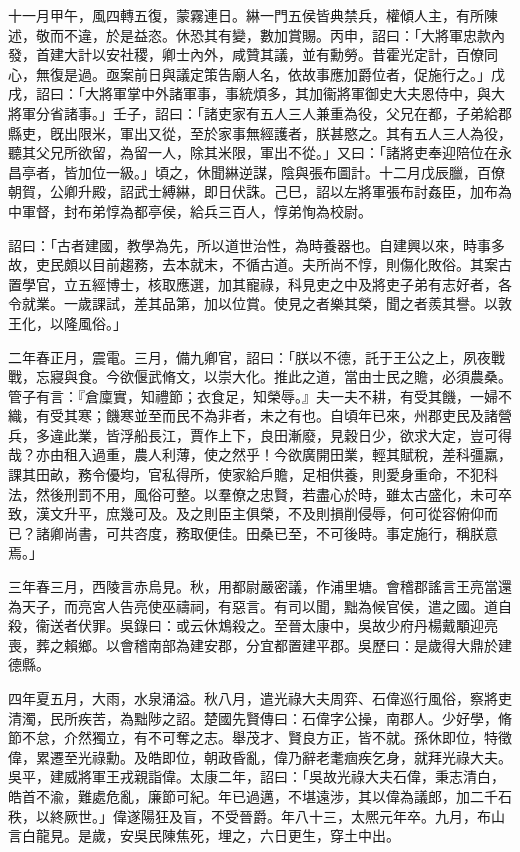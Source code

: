 \begin{pinyinscope}
十一月甲午，風四轉五復，蒙霧連日。綝一門五侯皆典禁兵，權傾人主，有所陳述，敬而不違，於是益恣。休恐其有變，數加賞賜。丙申，詔曰：「大將軍忠款內發，首建大計以安社稷，卿士內外，咸贊其議，並有勳勞。昔霍光定計，百僚同心，無復是過。亟案前日與議定策告廟人名，依故事應加爵位者，促施行之。」戊戌，詔曰：「大將軍掌中外諸軍事，事統煩多，其加衞將軍御史大夫恩侍中，與大將軍分省諸事。」壬子，詔曰：「諸吏家有五人三人兼重為役，父兄在都，子弟給郡縣吏，旣出限米，軍出又從，至於家事無經護者，朕甚愍之。其有五人三人為役，聽其父兄所欲留，為留一人，除其米限，軍出不從。」又曰：「諸將吏奉迎陪位在永昌亭者，皆加位一級。」頃之，休聞綝逆謀，陰與張布圖計。十二月戊辰臘，百僚朝賀，公卿升殿，詔武士縛綝，即日伏誅。己巳，詔以左將軍張布討姦臣，加布為中軍督，封布弟惇為都亭侯，給兵三百人，惇弟恂為校尉。

詔曰：「古者建國，教學為先，所以道世治性，為時養器也。自建興以來，時事多故，吏民頗以目前趨務，去本就末，不循古道。夫所尚不惇，則傷化敗俗。其案古置學官，立五經博士，核取應選，加其寵祿，科見吏之中及將吏子弟有志好者，各令就業。一歲課試，差其品第，加以位賞。使見之者樂其榮，聞之者羨其譽。以敦王化，以隆風俗。」

二年春正月，震電。三月，備九卿官，詔曰：「朕以不德，託于王公之上，夙夜戰戰，忘寢與食。今欲偃武脩文，以崇大化。推此之道，當由士民之贍，必須農桑。管子有言：『倉廩實，知禮節；衣食足，知榮辱。』夫一夫不耕，有受其饑，一婦不織，有受其寒；饑寒並至而民不為非者，未之有也。自頃年已來，州郡吏民及諸營兵，多違此業，皆浮船長江，賈作上下，良田漸廢，見穀日少，欲求大定，豈可得哉？亦由租入過重，農人利薄，使之然乎！今欲廣開田業，輕其賦稅，差科彊羸，課其田畝，務令優均，官私得所，使家給戶贍，足相供養，則愛身重命，不犯科法，然後刑罰不用，風俗可整。以羣僚之忠賢，若盡心於時，雖太古盛化，未可卒致，漢文升平，庶幾可及。及之則臣主俱榮，不及則損削侵辱，何可從容俯仰而已？諸卿尚書，可共咨度，務取便佳。田桑已至，不可後時。事定施行，稱朕意焉。」

三年春三月，西陵言赤烏見。秋，用都尉嚴密議，作浦里塘。會稽郡謠言王亮當還為天子，而亮宮人告亮使巫禱祠，有惡言。有司以聞，黜為候官侯，遣之國。道自殺，衞送者伏罪。吳錄曰：或云休鴆殺之。至晉太康中，吳故少府丹楊戴顒迎亮喪，葬之賴鄉。以會稽南部為建安郡，分宜都置建平郡。吳歷曰：是歲得大鼎於建德縣。

四年夏五月，大雨，水泉涌溢。秋八月，遣光祿大夫周弈、石偉巡行風俗，察將吏清濁，民所疾苦，為黜陟之詔。楚國先賢傳曰：石偉字公操，南郡人。少好學，脩節不怠，介然獨立，有不可奪之志。舉茂才、賢良方正，皆不就。孫休即位，特徵偉，累遷至光祿勳。及皓即位，朝政昏亂，偉乃辭老耄痼疾乞身，就拜光祿大夫。吳平，建威將軍王戎親詣偉。太康二年，詔曰：「吳故光祿大夫石偉，秉志清白，皓首不渝，難處危亂，廉節可紀。年已過邁，不堪遠涉，其以偉為議郎，加二千石秩，以終厥世。」偉遂陽狂及盲，不受晉爵。年八十三，太熈元年卒。九月，布山言白龍見。是歲，安吳民陳焦死，埋之，六日更生，穿土中出。


\end{pinyinscope}
